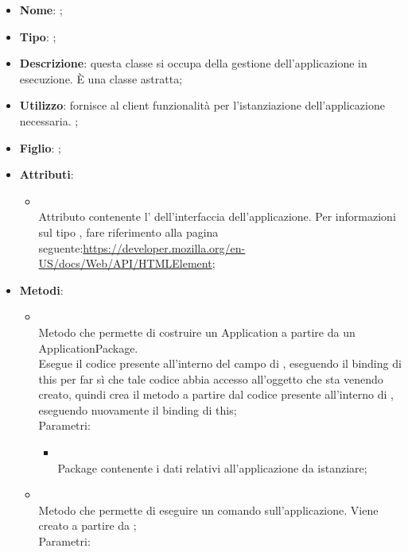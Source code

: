 \begin{itemize}
	\item \textbf{Nome}: ;
	\item \textbf{Tipo}: ;
	\item \textbf{Descrizione}: questa classe si occupa della gestione dell'applicazione in esecuzione. È una classe astratta;
	\item \textbf{Utilizzo}: fornisce al client funzionalità per l'istanziazione dell'applicazione necessaria. ;
	\item \textbf{Figlio}: ;
	\item \textbf{Attributi}:
	\begin{itemize}
		\item[]  \\
		Attributo contenente l' dell'interfaccia dell'applicazione. Per informazioni sul tipo , fare riferimento alla pagina seguente:\url{https://developer.mozilla.org/en-US/docs/Web/API/HTMLElement};
	\end{itemize}
	\item \textbf{Metodi}:
	\begin{itemize}
		\item[]  \\
		Metodo che permette di costruire un Application a partire da un ApplicationPackage. \\
Esegue il codice presente all'interno del campo  di , eseguendo il binding di this per far sì che tale codice abbia accesso all'oggetto che sta venendo creato, quindi crea il metodo  a partire dal codice presente all'interno di , eseguendo nuovamente il binding di this;\\
		Parametri:
		\begin{itemize}
			\item {} \\
			Package contenente i dati relativi all'applicazione da istanziare;
		\end{itemize}
		\item[]  \\
		Metodo che permette di eseguire un comando sull'applicazione. Viene creato a partire da ;\\
		Parametri:
		\begin{itemize}

\end{itemize}
\end{itemize}
\end{itemize}
